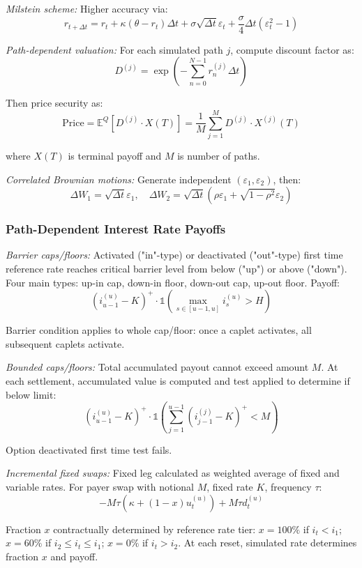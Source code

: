 \documentclass[12pt,a4paper]{article}
\begin{document}
\textit{Milstein scheme:} Higher accuracy via:
$$r_{t+\Delta t} = r_t + \kappa(\theta - r_t)\Delta t + \sigma\sqrt{\Delta t}\varepsilon_t + \frac{\sigma}{4}\Delta t(\varepsilon_t^2 - 1)$$

\textit{Path-dependent valuation:} For each simulated path $j$, compute discount factor as:
$$D^{(j)} = \exp\left(-\sum_{n=0}^{N-1} r_n^{(j)}\Delta t\right)$$

Then price security as:
$$\text{Price} = \mathbb{E}^Q[D^{(j)} \cdot X(T)] = \frac{1}{M}\sum_{j=1}^{M} D^{(j)} \cdot X^{(j)}(T)$$

where $X(T)$ is terminal payoff and $M$ is number of paths.

\textit{Correlated Brownian motions:} Generate independent $(\varepsilon_1, \varepsilon_2)$, then:
$$\Delta W_1 = \sqrt{\Delta t}\varepsilon_1, \quad \Delta W_2 = \sqrt{\Delta t}(\rho\varepsilon_1 + \sqrt{1-\rho^2}\varepsilon_2)$$

\subsubsection{Path-Dependent Interest Rate Payoffs}

\textit{Barrier caps/floors:} Activated ("in"-type) or deactivated ("out"-type) first time reference rate reaches critical barrier level from below ("up") or above ("down"). Four main types: up-in cap, down-in floor, down-out cap, up-out floor. Payoff:
$$\left(i_{u-1}^{(u)} - K\right)^+ \cdot \mathbb{1}\left(\max_{s \in [u-1,u]} i_s^{(u)} > H\right)$$

Barrier condition applies to whole cap/floor: once a caplet activates, all subsequent caplets activate.

\textit{Bounded caps/floors:} Total accumulated payout cannot exceed amount $M$. At each settlement, accumulated value is computed and test applied to determine if below limit:
$$\left(i_{u-1}^{(u)} - K\right)^+ \cdot \mathbb{1}\left(\sum_{j=1}^{u-1}\left(i_{j-1}^{(j)} - K\right)^+ < M\right)$$

Option deactivated first time test fails.

\textit{Incremental fixed swaps:} Fixed leg calculated as weighted average of fixed and variable rates. For payer swap with notional $M$, fixed rate $K$, frequency $\tau$:
$$-M\tau\left(\kappa + (1-x)u_t^{(u)}\right) + M\tau d_t^{(u)}$$

Fraction $x$ contractually determined by reference rate tier: $x = 100\%$ if $i_t < i_1$; $x = 60\%$ if $i_2 \leq i_t \leq i_1$; $x = 0\%$ if $i_t > i_2$. At each reset, simulated rate determines fraction $x$ and payoff.
\end{document}
